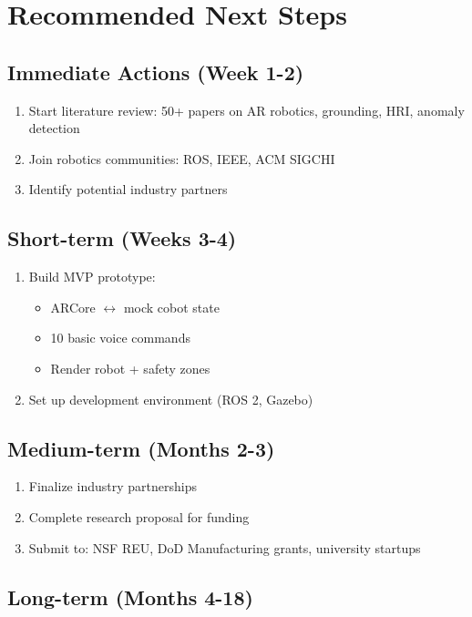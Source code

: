 \documentclass[12pt,a4paper,oneside]{book}
\begin{document}
\chapter{Recommended Next Steps}

\section{Immediate Actions (Week 1-2)}

\begin{enumerate}
    \item Start literature review: 50+ papers on AR robotics, grounding, HRI, anomaly detection
    \item Join robotics communities: ROS, IEEE, ACM SIGCHI
    \item Identify potential industry partners
\end{enumerate}

\section{Short-term (Weeks 3-4)}

\begin{enumerate}
    \item Build MVP prototype:
    \begin{itemize}
        \item ARCore $\leftrightarrow$ mock cobot state
        \item 10 basic voice commands
        \item Render robot + safety zones
    \end{itemize}
    \item Set up development environment (ROS 2, Gazebo)
\end{enumerate}

\section{Medium-term (Months 2-3)}

\begin{enumerate}
    \item Finalize industry partnerships
    \item Complete research proposal for funding
    \item Submit to: NSF REU, DoD Manufacturing grants, university startups
\end{enumerate}

\section{Long-term (Months 4-18)}
\end{document}
